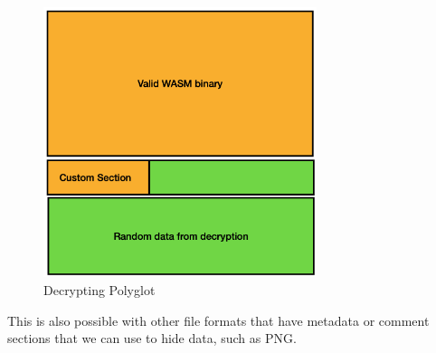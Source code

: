 \begin{figure}[h]
    \center
    \includegraphics[width=8cm]{images/dec.png}
    \caption{Decrypting Polyglot}
\end{figure}

This is also possible with other file formats that have metadata or comment sections that we can use to hide data, such as PNG.
